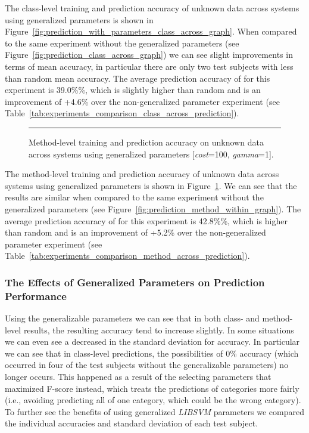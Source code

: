 The class-level training and prediction accuracy of unknown data across systems using generalized parameters is shown in Figure~\ref{fig:prediction_with_parameters_class_across_graph}. When compared to the same experiment without the generalized parameters (see Figure~\ref{fig:prediction_class_across_graph}) we can see slight improvements in terms of mean accuracy, in particular there are only two test subjects with less than random mean accuracy. The average prediction accuracy of for this experiment is 39.0\%\%, which is slightly higher than random and is an improvement of +4.6\% over the non-generalized parameter experiment (see Table~\ref{tab:experiments_comparison_class_across_prediction}).

\begin{figure}[!tb]
  \centering
  \begin{adjustbox}{max size={\textwidth}{\textheight}}
    
  \end{adjustbox}
  \caption{Method-level training and prediction accuracy on unknown data across systems using generalized parameters [\emph{cost}=100, \emph{gamma}=1].}
  \vspace{2mm}
  \hrule
  \label{fig:prediction_with_parameters_method_across_graph}
\end{figure}

The method-level training and prediction accuracy of unknown data across systems using generalized parameters is shown in Figure~\ref{fig:prediction_with_parameters_method_across_graph}. We can see that the results are similar when compared to the same experiment without the generalized parameters (see Figure~\ref{fig:prediction_method_within_graph}). The average prediction accuracy of for this experiment is 42.8\%\%, which is higher than random and is an improvement of +5.2\% over the non-generalized parameter experiment (see Table~\ref{tab:experiments_comparison_method_across_prediction}).


\subsubsection{The Effects of Generalized Parameters on Prediction Performance} 
\label{sububsec:comparison_prediction_performance_generalized}
Using the generalizable parameters we can see that in both class- and method-level results, the resulting accuracy tend to increase slightly. In some situations we can even see a decreased in the standard deviation for accuracy. In particular we can see that in class-level predictions, the possibilities of 0\% accuracy (which occurred in four of the test subjects without the generalizable parameters) no longer occurs. This happened as a result of the selecting parameters that maximized F-score instead, which treats the predictions of categories more fairly (i.e., avoiding predicting all of one category, which could be the wrong category). To further see the benefits of using generalized \emph{LIBSVM} parameters we compared the individual accuracies and standard deviation of each test subject.

